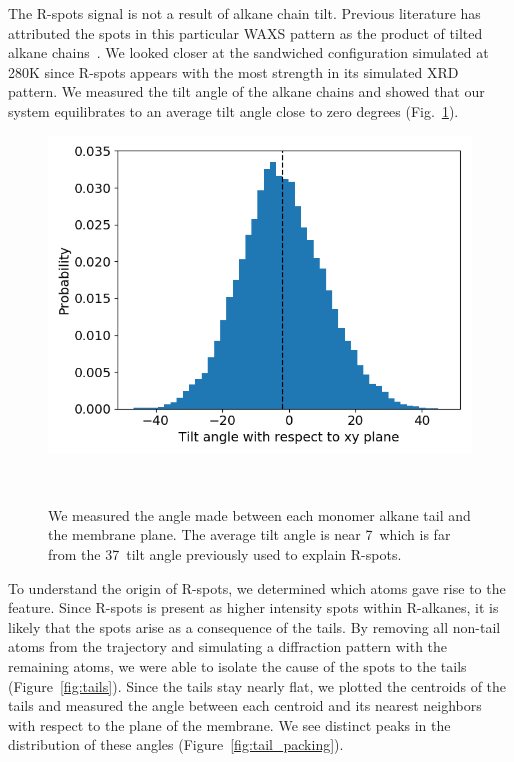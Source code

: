 \documentclass{article}
\begin{document}
  The R-spots signal is not a result of alkane chain tilt. Previous literature
  has attributed the spots in this particular WAXS pattern as the product of tilted alkane
  chains~\cite{feng_scalable_2014}. We looked closer at the sandwiched
  configuration simulated at 280K since R-spots appears with the most strength in 
  its simulated XRD pattern. We measured the tilt angle of the alkane chains and 
  showed that our system equilibrates to an average tilt angle close to zero degrees
  (Fig.~\ref{fig:tilt}). 
  
  \begin{figure}
  \centering
  \includegraphics[width=0.5\linewidth]{tilt_dist.png}
  \caption{We measured the angle made between each monomer alkane tail and the
	  membrane plane. The average tilt angle is near 7\degree~which is far from the
	  37\degree~tilt angle previously used to explain R-spots.}~\label{fig:tilt}
  \end{figure}

  To understand the origin of R-spots, we determined which
  atoms gave rise to the feature. Since R-spots is present as higher intensity
  spots within R-alkanes, it is likely that the spots arise as a consequence of
  the tails. By removing all non-tail atoms from the trajectory and simulating a
  diffraction pattern with the remaining atoms, we were able to isolate the cause of the spots to the
  tails (Figure~\ref{fig:tails}). Since the tails stay nearly flat, we plotted
  the centroids of the tails and measured the angle between each centroid and its
  nearest neighbors with respect to the plane of the membrane.  We see distinct
  peaks in the distribution of these angles (Figure~\ref{fig:tail_packing}).

  
\end{document}
